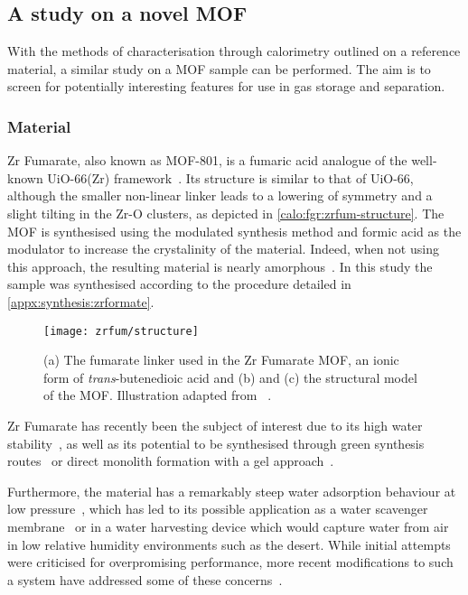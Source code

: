 
\subsection{A study on a novel MOF}

With the methods of characterisation through calorimetry
outlined on a reference material, a similar study on a 
MOF sample can be performed. The aim is to screen for 
potentially interesting features for use in gas 
storage and separation.

\subsubsection{Material}

Zr Fumarate, also known as MOF-801, is a fumaric 
acid analogue of the well-known UiO-66(Zr) 
framework~\cite{wissmannModulatedSynthesisZrfumarate2012}.
Its structure is similar to that of UiO-66, although 
the smaller non-linear linker leads to a lowering of 
symmetry and a slight tilting in the Zr-O clusters,
as depicted in \autoref{calo:fgr:zrfum-structure}.
The MOF is synthesised using the modulated synthesis method and 
formic acid as the modulator to increase the crystalinity of the
material. Indeed, when not using this approach, the resulting
material is nearly amorphous~\cite{zahnInsightMechanismModulated2014}.
In this study the sample was synthesised according to the procedure 
detailed in \autoref{appx:synthesis:zrformate}.

\begin{figure}[htb]
    \centering
    \texttt{[image: zrfum/structure]}%
    \caption{(a) The fumarate linker used in the Zr Fumarate
    MOF, an ionic form of \textit{trans}-butenedioic acid and
    (b) and (c) the structural model of the MOF. Illustration
    adapted from~\citeauthor{wissmannModulatedSynthesisZrfumarate2012}%
    \cite{wissmannModulatedSynthesisZrfumarate2012}.}%
    \label{calo:fgr:zrfum-structure}
\end{figure}

Zr Fumarate has recently been the subject of interest due to its
high water stability~\cite{zahnWaterbornZrbasedPorous2015}, 
as well as its potential to be synthesised through green synthesis
routes~\cite{reinschFacileGreenRoute2016} or direct
monolith formation with a gel approach~\cite{buekenGelbasedMorphologicalDesign2017}.

Furthermore, the material has a remarkably steep water adsorption
behaviour at low pressure~\cite{furukawaWaterAdsorptionPorous2014},
which has led to its possible application as a water scavenger 
membrane~\cite{baeTransparentMetalOrganic2016} or in a water 
harvesting device which would capture water from air in low relative
humidity environments such as the desert. While initial 
attempts~\cite{kimWaterHarvestingAir2017} were criticised for
overpromising performance, more recent modifications to such 
a system have addressed some of these 
concerns~\cite{kimAdsorptionbasedAtmosphericWater2018}.

